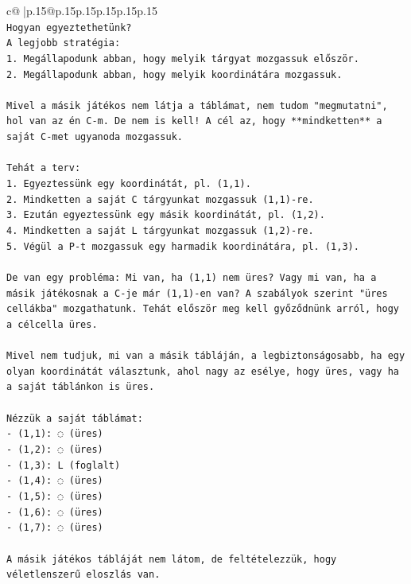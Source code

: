 \documentclass{article}
\begin{document}
{\begin{supertabular}{c@{$\;$}|p{.15\linewidth}@{}p{.15\linewidth}p{.15\linewidth}p{.15\linewidth}p{.15\linewidth}p{.15\linewidth}}
{{{\\ 
\texttt{Hogyan egyeztethetünk?} \\
\texttt{A legjobb stratégia:} \\
\texttt{1. Megállapodunk abban, hogy melyik tárgyat mozgassuk először.} \\
\texttt{2. Megállapodunk abban, hogy melyik koordinátára mozgassuk.} \\
\\ 
\texttt{Mivel a másik játékos nem látja a táblámat, nem tudom "megmutatni", hol van az én C{-}m. De nem is kell! A cél az, hogy **mindketten** a saját C{-}met ugyanoda mozgassuk.} \\
\\ 
\texttt{Tehát a terv:} \\
\texttt{1. Egyeztessünk egy koordinátát, pl. (1,1).} \\
\texttt{2. Mindketten a saját C tárgyunkat mozgassuk (1,1){-}re.} \\
\texttt{3. Ezután egyeztessünk egy másik koordinátát, pl. (1,2).} \\
\texttt{4. Mindketten a saját L tárgyunkat mozgassuk (1,2){-}re.} \\
\texttt{5. Végül a P{-}t mozgassuk egy harmadik koordinátára, pl. (1,3).} \\
\\ 
\texttt{De van egy probléma: Mi van, ha (1,1) nem üres? Vagy mi van, ha a másik játékosnak a C{-}je már (1,1){-}en van? A szabályok szerint "üres cellákba" mozgathatunk. Tehát először meg kell győződnünk arról, hogy a célcella üres.} \\
\\ 
\texttt{Mivel nem tudjuk, mi van a másik tábláján, a legbiztonságosabb, ha egy olyan koordinátát választunk, ahol nagy az esélye, hogy üres, vagy ha a saját táblánkon is üres.} \\
\\ 
\texttt{Nézzük a saját táblámat:} \\
\texttt{{-} (1,1): ◌ (üres)} \\
\texttt{{-} (1,2): ◌ (üres)} \\
\texttt{{-} (1,3): L (foglalt)} \\
\texttt{{-} (1,4): ◌ (üres)} \\
\texttt{{-} (1,5): ◌ (üres)} \\
\texttt{{-} (1,6): ◌ (üres)} \\
\texttt{{-} (1,7): ◌ (üres)} \\
\\ 
\texttt{A másik játékos tábláját nem látom, de feltételezzük, hogy véletlenszerű eloszlás van.} \\
}}}
\end{supertabular}}
\end{document}
